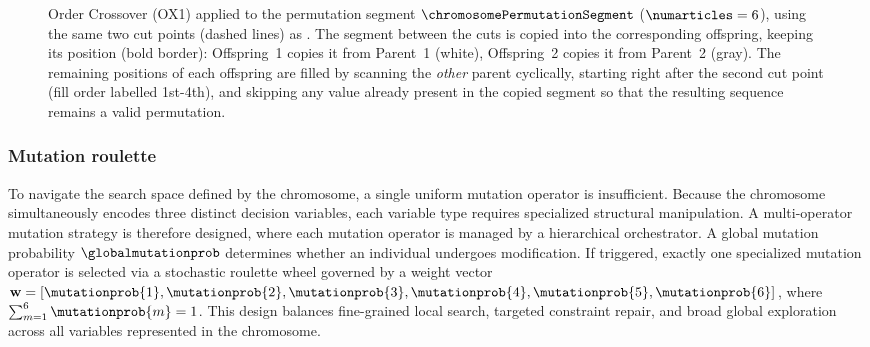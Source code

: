 \begin{figure}[htbp]
    \caption{Order Crossover (OX1) applied to the permutation segment $\chromosomePermutationSegment$ ($\numarticles=6$), using the same two cut points (dashed lines) as . The segment between the cuts is copied into the corresponding offspring, keeping its position (bold border): Offspring~1 copies it from Parent~1 (white), Offspring~2 copies it from Parent~2 (gray). The remaining positions of each offspring are filled by scanning the \emph{other} parent cyclically, starting right after the second cut point (fill order labelled 1st-4th), and skipping any value already present in the copied segment so that the resulting sequence remains a valid permutation.}
    \label{fig:ox1_crossover}
\end{figure}


\subsubsection{Mutation roulette}

To navigate the search space defined by the chromosome, a single uniform mutation operator is insufficient. Because the chromosome simultaneously encodes three distinct decision variables, each variable type requires specialized structural manipulation. A multi-operator mutation strategy is therefore designed,
where each mutation operator is managed by a hierarchical orchestrator. A global mutation probability $\globalmutationprob$ determines whether an individual undergoes modification. If triggered, exactly one specialized mutation operator is selected via a stochastic roulette wheel governed by a weight vector $\mathbf{w} = [\mutationprob{1}, \mutationprob{2}, \mutationprob{3}, \mutationprob{4}, \mutationprob{5}, \mutationprob{6}]$, where $\sum_{m=1}^{6} \mutationprob{m} = 1$. This design balances fine-grained local search, targeted constraint repair, and broad global exploration across all variables represented in the chromosome.

